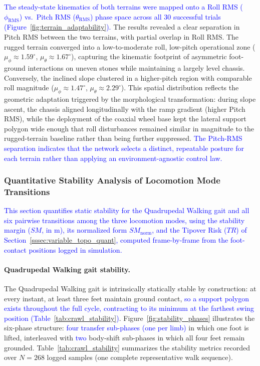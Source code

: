 \documentclass[preprint,12pt]{elsarticle}
\newcommand{\revblue}[1]{\textcolor{blue}{#1}}
\begin{document}
\revblue{The steady-state kinematics of both terrains were mapped onto a Roll RMS ($\phi_{\text{RMS}}$) vs.\ Pitch RMS ($\theta_{\text{RMS}}$) phase space across all 30 successful trials (Figure~\ref{fig:terrain_adaptability}).} The results revealed a clear separation in Pitch RMS between the two terrains, with partial overlap in Roll RMS. The rugged terrain converged into a low-to-moderate roll, low-pitch operational zone ($\mu_{\phi} \approx 1.59^{\circ}$, $\mu_{\theta} \approx 1.67^{\circ}$), capturing the kinematic footprint of asymmetric foot-ground interactions on uneven stones while maintaining a largely level chassis. Conversely, the inclined slope clustered in a higher-pitch region with comparable roll magnitude ($\mu_{\phi} \approx 1.47^{\circ}$, $\mu_{\theta} \approx 2.29^{\circ}$). This spatial distribution reflects the geometric adaptation triggered by the morphological transformation: during slope ascent, the chassis aligned longitudinally with the ramp gradient (higher Pitch RMS), while the deployment of the coaxial wheel base kept the lateral support polygon wide enough that roll disturbances remained similar in magnitude to the rugged-terrain baseline rather than being further suppressed. \revblue{The Pitch-RMS separation indicates that the network selects a distinct, repeatable posture for each terrain rather than applying an environment-agnostic control law.}

\subsubsection{Quantitative Stability Analysis of Locomotion Mode Transitions}
\label{sssec:transition_stability}

%
\revblue{This section quantifies static stability for the Quadrupedal Walking gait and all six pairwise transitions among the three locomotion modes, using the stability margin ($SM$, in m), its normalized form $SM_{\mathrm{norm}}$, and the Tipover Risk ($TR$) of Section~\ref{sssec:variable_topo_quant}, computed frame-by-frame from the foot-contact positions logged in simulation.}


\paragraph{Quadrupedal Walking gait stability.}

%
The Quadrupedal Walking gait is intrinsically
statically stable by construction: at every instant, at least three feet
maintain ground contact, \revblue{so a support polygon exists throughout the full cycle, contracting to its minimum at the farthest swing position (Table~\ref{tab:crawl_stability})}.
Figure~\ref{fig:stability_phases} illustrates the six-phase
structure: \revblue{four transfer sub-phases (one per limb)} in which one foot is
lifted, interleaved with \revblue{two} body-shift sub-phases in which all four
feet remain grounded.
Table~\ref{tab:crawl_stability} summarizes the stability metrics
recorded over $N = 268$ logged samples (one complete representative
walk sequence).
\end{document}
